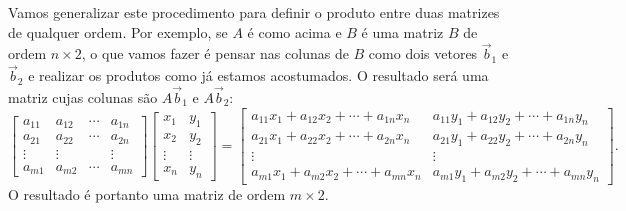 Vamos generalizar este procedimento para definir o produto entre duas matrizes de qualquer ordem. Por exemplo, se $A$ é como acima e $B$ é uma matriz $B$ de ordem $n \times 2$, o que vamos fazer é pensar nas colunas de $B$ como dois vetores $\vec{b}_1$ e $\vec{b}_2$ e realizar os produtos como já estamos acostumados. O resultado será uma matriz cujas colunas são $A \vec{b}_1$ e $A \vec{b}_2$:
\begin{equation}
\begin{bmatrix}
a_{11} & a_{12} & \cdots & a_{1n} \\
a_{21} & a_{22} & \cdots & a_{2n} \\
\vdots & \vdots &        & \vdots \\
a_{m1} & a_{m2} & \cdots & a_{mn} 
\end{bmatrix}
\begin{bmatrix}
x_{1} & y_1 \\
x_{2} & y_2 \\
\vdots & \vdots \\
x_{n} & y_n 
\end{bmatrix} =
\begin{bmatrix}
a_{11} x_{1} + a_{12} x_{2} + \cdots + a_{1n} x_{n} & a_{11} y_{1} + a_{12} y_{2} + \cdots + a_{1n} y_{n}\\
a_{21} x_{1} + a_{22} x_{2} + \cdots + a_{2n} x_{n} & a_{21} y_{1} + a_{22} y_{2} + \cdots + a_{2n} y_{n}\\
\vdots & \vdots \\
a_{m1} x_{1} + a_{m2} x_{2} + \cdots + a_{mn} x_{n} & a_{m1} y_{1} + a_{m2} y_{2} + \cdots + a_{mn} y_{n}
\end{bmatrix}.
\end{equation} O resultado é portanto uma matriz de ordem $m\times 2$.


